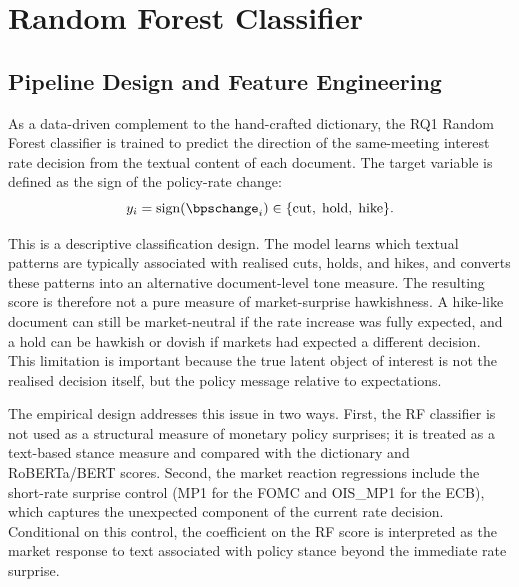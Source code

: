 \section{Random Forest Classifier}
\label{sec:meth_rf}

\subsection{Pipeline Design and Feature Engineering}
\label{sec:meth_rf_design}
\label{sec:meth_rf_tfidf}

As a data-driven complement to the hand-crafted dictionary, the RQ1
Random Forest classifier \citep{breiman2001} is trained to predict
the direction of the same-meeting interest rate decision from the
textual content of each document. The target variable is defined as
the sign of the policy-rate change:
%
\begin{equation}
\label{eq:rf_target}
y_i = \text{sign}(\bpschange_i) \in
  \{\text{cut},\; \text{hold},\; \text{hike}\}.
\end{equation}

This is a descriptive classification design. The model learns which
textual patterns are typically associated with realised cuts, holds,
and hikes, and converts these patterns into an alternative
document-level tone measure. The resulting score is therefore not a
pure measure of market-surprise hawkishness. A hike-like document can
still be market-neutral if the rate increase was fully expected, and
a hold can be hawkish or dovish if markets had expected a different
decision. This limitation is important because the true latent object
of interest is not the realised decision itself, but the policy
message relative to expectations.

The empirical design addresses this issue in two ways. First, the RF
classifier is not used as a structural measure of monetary policy
surprises; it is treated as a text-based stance measure and compared
with the dictionary and RoBERTa/BERT scores. Second, the market
reaction regressions include the short-rate surprise control
(MP1 for the FOMC and OIS\_MP1 for the ECB), which captures the
unexpected component of the current rate decision. Conditional on
this control, the coefficient on the RF score is interpreted as the
market response to text associated with policy stance beyond the
immediate rate surprise.


